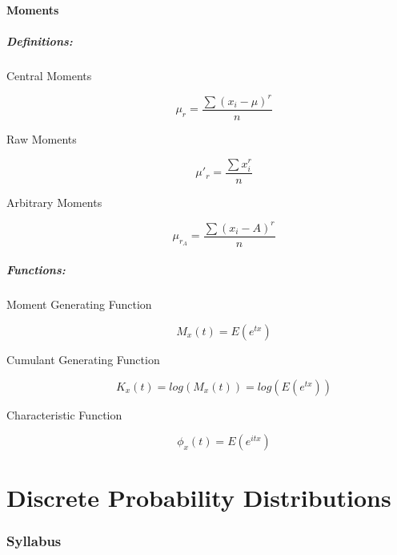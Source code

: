 \documentclass[
10pt, %
a4paper, %
]{report}
\begin{document}
\subsection*{Moments}
\subsubsection*{Definitions:}
\begin{description}
  \item[Central Moments]
    \[
    \mu_r = \frac{\sum(x_i-\mu)^r}{n}
    \]
  \item[Raw Moments]
    \[
    \mu'_r = \frac{\sum x_i^r}{n}
    \]
  \item[Arbitrary Moments]
    \[
    \mu_{r_A} = \frac{\sum(x_i-A)^r}{n}
    \]
    
\end{description}

\subsubsection*{Functions:}
\begin{description}
  \item[Moment Generating Function]
    \[
    M_x(t) = E(e^{tx})
    \]
  \item[Cumulant Generating Function]
    \[
    K_x(t) = log(M_x(t)) = log(E(e^{tx}))
    \]
  \item[Characteristic Function ]
    \[
    \phi_x(t) = E(e^{itx})
    \]
    
\end{description}

\part{Discrete Probability Distributions}
\section*{Syllabus}
\end{document}
